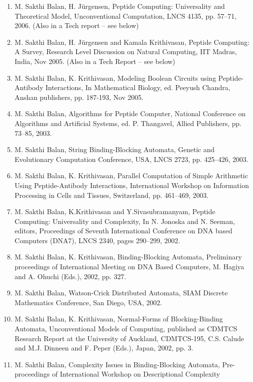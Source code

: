 \documentclass[11pt]{article}
\begin{document}
\begin{enumerate}
\item M. Sakthi Balan, H. J\"{u}rgensen, Peptide Computing:
  Universality and Theoretical Model, Unconventional Computation, LNCS
  4135, pp. 57--71, 2006. (Also in a Tech report -- see below)
 \item M. Sakthi Balan, H. J\"{u}rgensen and Kamala Krithivasan,
   Peptide Computing: A Survey, Research Level Discussion on Natural
   Computing, IIT Madras, India, Nov 2005. (Also in a Tech Report --
   see below)
\item M. Sakthi Balan, K. Krithivasan, Modeling Boolean Circuits using
Peptide-Antibody Interactions, In Mathematical Biology, ed.  Peeyush
Chandra, Anshan publishers, pp. 187-193, Nov 2005.
\item M. Sakthi Balan, Algorithms for Peptide Computer, National
Conference on Algorithms and Artificial Systems, ed. P. Thangavel,
Allied Publishers, pp. 73--85, 2003.
\item M. Sakthi Balan, String Binding-Blocking Automata, Genetic and
Evolutionary Computation Conference, USA, LNCS 2723, pp. 425--426,
2003. 
\item M. Sakthi Balan, K. Krithivasan, Parallel Computation of Simple
Arithmetic Using Peptide-Antibody Interactions, International Workshop
on Information Processing in Cells and Tissues, Switzerland,
pp. 461--469, 2003.
\item M. Sakthi Balan, K.Krithivasan and Y.Sivasubramanyam, Peptide
Computing: Universality and Complexity, In N. Jonoska and N. Seeman,
editors, Proceedings of Seventh International Conference on DNA based
Computers (DNA7), LNCS 2340, pages 290--299, 2002.
\item M. Sakthi Balan, K. Krithivasan, Binding-Blocking Automata,
Preliminary proceedings of International Meeting on DNA Based
Computers, M. Hagiya and A. Ohuchi (Eds.), 2002, pp. 327.
\item M. Sakthi Balan, Watson-Crick Distributed Automata, SIAM
Discrete Mathematics Conference, San Diego, USA, 2002.
\item M. Sakthi Balan, K. Krithivasan, Normal-Forms of
Blocking-Binding Automata, Unconventional Models of Computing,
published as CDMTCS Research Report at the University of Auckland,
CDMTCS-195, C.S. Calude and M.J. Dinneen and F. Peper (Eds.), Japan,
2002, pp. 3.
\item M. Sakthi Balan, Complexity Issues in Binding-Blocking Automata,
Pre-proceedings of International Workshop on Descriptional Complexity

\end{enumerate}
\end{document}
